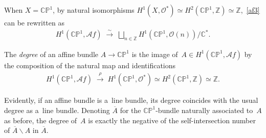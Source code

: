 \documentclass[11pt]{article}
\numberwithin{equation}{section}
\begin{document}
When $X=\mathbb{CP}^1$, by natural isomorphisms $H^1(X,\mathscr O^*) \simeq H^2(\mathbb{CP}^1,\mathbb{Z})\simeq
\mathbb{Z}$,~\eqref{af3} can be rewritten as
\begin{gather}
\label{af4}
H^1(\mathbb{CP}^1,\mathscr Af)
\;\stackrel{\sim}{\longrightarrow}
\;
\bigsqcup_{n\in\mathbb{Z}} H^1(\mathbb{CP}^1, \mathscr O(n)) /\mathbb{C}^*.
\end{gather}

\begin{Definition}\label{def:degree}
The {\em degree} of an af\/f\/ine bundle $A\to\mathbb{CP}^1$ is the image of~$A\in H^1(\mathbb{CP}^1,\mathscr Af)$ by
the composition of the natural map and identif\/ications
\begin{gather*}
H^1(\mathbb{CP}^1,\mathscr Af)
\;\stackrel{\rho}{\longrightarrow}
\;
H^1(\mathbb{CP}^1,\mathscr O^*)\simeq
H^2(\mathbb{CP}^1,\mathbb{Z})\simeq \mathbb{Z}.
\end{gather*}
\end{Definition}

Evidently, if an af\/f\/ine bundle is a~line bundle, its degree coincides with the usual degree as a~line bundle.
Denoting $\overline A$ for the $\mathbb{CP}^1$-bundle naturally associated to~$A$ as before, the degree of~$A$ is
exactly the negative of the self-intersection number of $\overline A\backslash A$ in $\overline A$.
\end{document}
